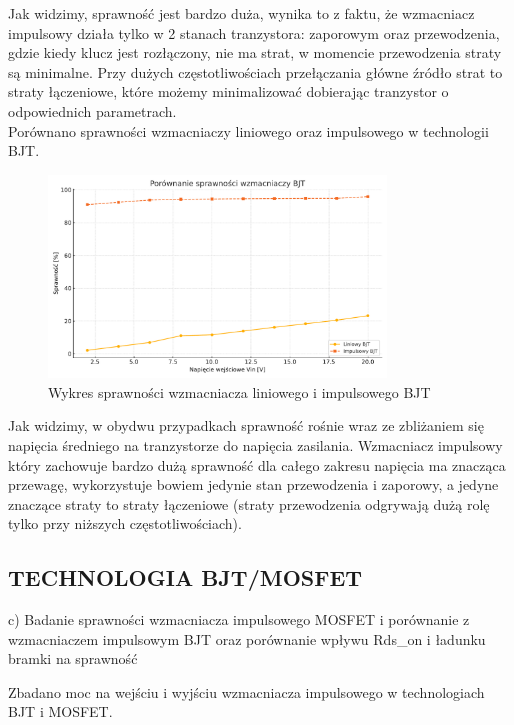 \documentclass[11pt]{article}
\begin{document}
Jak widzimy, sprawność jest bardzo duża, wynika to z faktu, że wzmacniacz impulsowy działa tylko w 2 stanach tranzystora:
zaporowym oraz przewodzenia, gdzie kiedy klucz jest rozłączony, nie ma strat, w momencie przewodzenia straty są minimalne. Przy dużych częstotliwościach przełączania główne źródło strat to straty łączeniowe, które możemy minimalizować dobierając tranzystor o odpowiednich parametrach.\\

Porównano sprawności wzmacniaczy liniowego oraz impulsowego w technologii BJT.\\

\begin{figure}[H]
\centering
\includegraphics[width=0.8\textwidth]{aun1_liniowy_impulsowy_bjt.pdf}
\caption{Wykres sprawności wzmacniacza liniowego i impulsowego BJT}
\end{figure}

Jak widzimy, w obydwu przypadkach sprawność rośnie wraz ze zbliżaniem się napięcia średniego na tranzystorze do napięcia zasilania. Wzmacniacz impulsowy który zachowuje bardzo dużą sprawność dla całego zakresu napięcia ma znacząca przewagę,
wykorzystuje bowiem jedynie stan przewodzenia i zaporowy, a jedyne znaczące straty to straty łączeniowe
(straty przewodzenia odgrywają dużą rolę tylko przy niższych częstotliwościach).\\

\subsection{TECHNOLOGIA BJT/MOSFET}

c) Badanie sprawności wzmacniacza impulsowego MOSFET i porównanie z wzmacniaczem impulsowym BJT oraz porównanie wpływu Rds_on i ładunku bramki na sprawność

Zbadano moc na wejściu i wyjściu wzmacniacza impulsowego w technologiach BJT i MOSFET.\\
\end{document}
